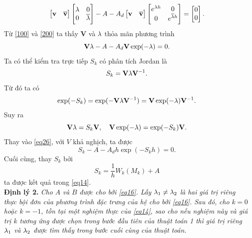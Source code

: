 \begin{equation}\label{200}
	\begin{bmatrix}
		\mathbf{v}&\mathbf{\overline{v}}
	\end{bmatrix}
	\begin{bmatrix}
		\lambda & 0 \\ 0 & \overline{\lambda}
	\end{bmatrix}
	- A - A_d \begin{bmatrix}
		\mathbf{v}&\mathbf{\overline{v}}
	\end{bmatrix} \begin{bmatrix}
		e^{\lambda h } & 0 \\ 0 & e^{\overline{\lambda} h }
	\end{bmatrix} = \begin{bmatrix}
		0\\0
	\end{bmatrix}.
\end{equation}
Từ \eqref{100} và \eqref{200} ta thấy $\mathbf{V}$ và $\mathbf{\lambda}$  thỏa mãn phương trình
\begin{equation}\label{eq26}
	\mathbf{V} \mathbf{\lambda} - A - A_d \mathbf{V} \exp (-\mathbf{\lambda})=0.
\end{equation}
Ta có thể kiểm tra trực tiếp $S_k$ có phân tích Jordan là
\begin{equation}\label{eq27}
	S_k = \mathbf{V} \mathbf{\lambda} \mathbf{V}^{-1}.
\end{equation}
Từ đó ta có
\begin{equation}\label{eq28}
	\exp(-S_k) = \exp (-\mathbf{V} \mathbf{\lambda} \mathbf{V}^{-1}) = \mathbf{V} \exp(-\mathbf{\lambda}) \mathbf{V}^{-1}.
\end{equation}
Suy ra
\begin{equation}\label{eq29}
	\mathbf{V} \mathbf{\lambda} = S_k \mathbf{V}, \quad \mathbf{V} \exp(-\mathbf{\lambda}) = \exp(-S_k) \mathbf{V}.	
\end{equation}
Thay vào \eqref{eq26}, với $V$ khả nghịch, ta được
\begin{equation}\label{eq30}
	S_k -A - A_d h  \exp (-S_k h ) =0 .
\end{equation}
Cuối cùng, thay $S_k$ bởi 
\begin{equation}\label{eq31}
	S_k = \dfrac{1}{h }W_k(M_k)+A
\end{equation}
ta được kết quả trong \eqref{eq14}.\\
\noindent\textbf{Định lý 2.} \textit{Cho $A$ và $B$ được cho bởi \eqref{eq16}. Lấy $\lambda_1 \ne \lambda_2$ là hai giá trị riêng thực bội đơn của phương trình đặc trưng của hệ cho bởi \eqref{eq16}. Sau đó, cho $k =0$ hoặc $k =-1$, tồn tại một nghiệm thực của \eqref{eq14}, sao cho nếu nghiệm này và giá trị $k$ tương ứng được chọn trong bước đầu tiên của thuật toán 1 thì giá trị riêng $\lambda_1$ và $\lambda_2$ được tìm thấy trong bước cuối cùng của thuật toán. }\\
